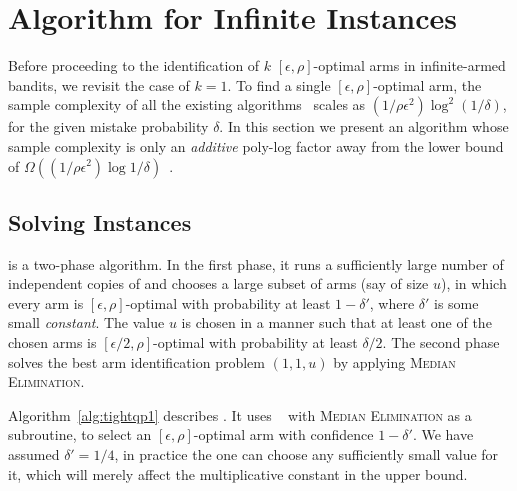 \section{Algorithm for Infinite Instances}
\label{sec:infinitemab}

Before proceeding to the identification of $k$ 
$[\epsilon, \rho]$-optimal arms in infinite-armed bandits, we revisit the case of $k = 1$. To find a single $[\epsilon, \rho]$-optimal arm,
the sample complexity of all the existing algorithms~\citep{bib:arcsk2017,Aziz+AKA:2018} scales as
$(1/\rho \epsilon^{2})\log^2(1/\delta)$, for the given mistake probability $\delta$. In this section
we present an algorithm \PPP whose sample complexity is only an \textit{additive} poly-log factor
away from the lower bound of $\Omega((1/\rho \epsilon^{2})\log 1/\delta)$~\citep[Corollary 3.4]{bib:arcsk2017}.
 
\subsection{Solving \protect\QP Instances}
\label{subsec:tighterqp}
\PPP is a two-phase algorithm.
In the first phase, it runs a sufficiently large number of independent copies of \PP and chooses
a large subset of arms  (say of size $u$), in which every arm is $[\epsilon, \rho]$-optimal 
with probability at least $1-\delta'$, where $\delta'$ is some small \textit{constant}. 
The value $u$ is chosen in a manner such that at least one of the chosen arms is 
$[\epsilon/2, \rho]$-optimal with probability at least $\delta/2$.
The second phase solves the best arm identification problem $(1,1,u)$ by applying \textsc{Median Elimination}.

Algorithm~\ref{alg:tightqp1} describes \PPP. It uses \PP~\citep{bib:arcsk2017} with  \textsc{ Median Elimination}  as a 
subroutine, to select an  $[\epsilon, \rho]$-optimal arm with confidence $1-\delta'$.
We have assumed $\delta' = 1/4$, in practice the one can choose any
sufficiently small value for it, which will merely affect the multiplicative constant in the upper bound.


